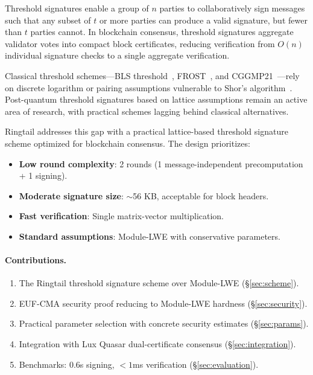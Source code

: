 \documentclass[11pt,a4paper]{article}
\begin{document}
Threshold signatures enable a group of $n$ parties to collaboratively sign messages
such that any subset of $t$ or more parties can produce a valid signature, but fewer
than $t$ parties cannot. In blockchain consensus, threshold signatures aggregate
validator votes into compact block certificates, reducing verification from $O(n)$
individual signature checks to a single aggregate verification.

Classical threshold schemes---BLS threshold~\cite{boldyreva2003threshold},
FROST~\cite{komlo2020frost}, and CGGMP21~\cite{canetti2021uc}---rely on discrete
logarithm or pairing assumptions vulnerable to Shor's algorithm~\cite{shor1997polynomial}.
Post-quantum threshold signatures based on lattice assumptions remain an active area
of research, with practical schemes lagging behind classical alternatives.

Ringtail addresses this gap with a practical lattice-based threshold signature scheme
optimized for blockchain consensus. The design prioritizes:
\begin{itemize}[nosep]
\item \textbf{Low round complexity}: 2 rounds (1 message-independent precomputation + 1 signing).
\item \textbf{Moderate signature size}: $\sim$56 KB, acceptable for block headers.
\item \textbf{Fast verification}: Single matrix-vector multiplication.
\item \textbf{Standard assumptions}: Module-LWE with conservative parameters.
\end{itemize}

\paragraph{Contributions.}
\begin{enumerate}[nosep]
\item The Ringtail threshold signature scheme over Module-LWE (\S\ref{sec:scheme}).
\item EUF-CMA security proof reducing to Module-LWE hardness (\S\ref{sec:security}).
\item Practical parameter selection with concrete security estimates (\S\ref{sec:params}).
\item Integration with Lux Quasar dual-certificate consensus (\S\ref{sec:integration}).
\item Benchmarks: 0.6s signing, $< 1$ms verification (\S\ref{sec:evaluation}).
\end{enumerate}
\end{document}
